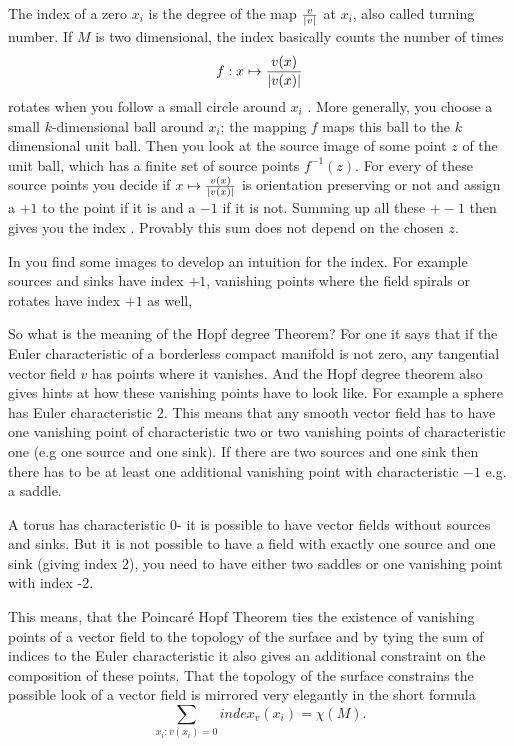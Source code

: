 The index of a zero $x_i$ is the degree of the map $\frac{v}{\left| v \right|}$ at $x_i$, also called turning number. If $M$ is two dimensional, the index basically counts the number of times \[f: x \mapsto \frac{v(x)}{\left| v(x) \right|}\] 
rotates when you follow a small circle around $x_i$ . More generally, you choose a small $k$-dimensional ball around $x_i$; the mapping $f$ maps this ball to the $k$ dimensional unit ball. Then you look at the source image of some point $z$ of the unit ball, which has a finite set of source points $f^{-1}(z)$. For every of these source points you decide if $x \mapsto \frac{v(x)}{\left| v(x) \right|}$ is orientation preserving or not and assign a $+1$ to the point if it is and a $-1$ if it is not. Summing up all these $+-1$ then gives you the index . Provably this sum does not depend on the chosen $z$.

In  you find some images to develop an intuition for the index. For example sources and sinks have index $+1$, vanishing points where the field spirals or rotates have index $+1$ as well, 

So what is the meaning of the Hopf degree Theorem? For one it says that if the Euler characteristic of a borderless compact manifold is not zero, any tangential vector field $v$ has points where it vanishes. And the Hopf degree theorem also gives hints at how these vanishing points have to look like. For example a sphere has Euler characteristic $2$. This means that any smooth vector field has to have one vanishing point of characteristic two or two vanishing points of characteristic one (e.g one source and one sink). If there are two sources and one sink then there has to be at least one additional vanishing point with characteristic $-1$ e.g. a saddle. 

A torus has characteristic $0$- it is possible to have vector fields without sources and sinks. But it is not possible to have a field with exactly one source and one sink (giving index 2), you need to have either two saddles or one vanishing point with index -2. 

This means, that the Poincar\'e Hopf Theorem ties the existence of vanishing points of a vector field to the topology of the surface and by tying the sum of indices to the Euler characteristic it also gives an additional constraint on the composition of these points. That the topology of  the surface constrains the possible look of a vector field is mirrored very elegantly in the short formula
\[\sum_{x_i: v(x_i) = 0} index_v(x_i) = \chi(M).\]

